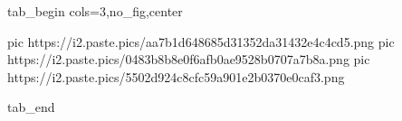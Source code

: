  
 
 
 
 


\ifcmt
  tab_begin cols=3,no_fig,center

     pic https://i2.paste.pics/aa7b1d648685d31352da31432e4c4cd5.png
		 pic https://i2.paste.pics/0483b8b8e0f6afb0ae9528b0707a7b8a.png
		 pic https://i2.paste.pics/5502d924c8cfc59a901e2b0370e0caf3.png

  tab_end
\fi
